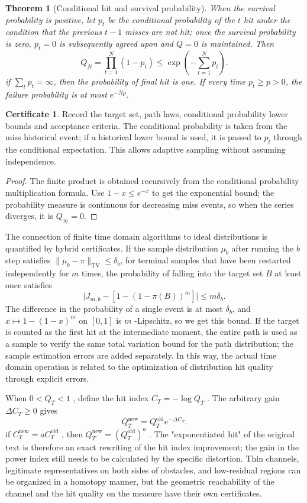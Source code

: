 \documentclass[11pt,a4paper]{article}
\theoremstyle{plain}
\newtheorem{theorem}{Theorem}[section]
\theoremstyle{definition}
\newtheorem*{certificate}{Certificate}
\theoremstyle{remark}
\begin{document}
\begin{CJK*}
\begin{theorem}
[Conditional hit and survival probability]\label{ss:survival}
When the survival probability is positive, let $p_t$ be the conditional probability of the $t$ hit under the condition that the previous $t-1$ misses are not hit; once the survival probability is zero, $p_t=0$ is subsequently agreed upon and $Q=0$ is maintained. Then \[
 Q_N=\prod_{t=1}^N(1-p_t)
 \le\exp\left(-\sum_{t=1}^Np_t\right).
\] if $\sum_t p_t=\infty$, then the probability of final hit is one. If every time $p_t\ge p>0$, the failure probability is at most $e^{-Np}$.\end{theorem}
\begin{certificate}
Record the target set, path laws, conditional probability lower bounds and acceptance criteria. The conditional probability is taken from the miss historical event; if a historical lower bound is used, it is passed to $p_t$ through the conditional expectation. This allows adaptive sampling without assuming independence.\end{certificate}
\begin{proof}
The finite product is obtained recursively from the conditional probability multiplication formula. Use $1-x\le e^{-x}$ to get the exponential bound; the probability measure is continuous for decreasing miss events, so when the series diverges, it is $Q_\infty=0$.\end{proof}


The connection of finite time domain algorithms to ideal distributions is quantified by hybrid certificates. If the sample distribution $\mu_b$ after running the $b$ step satisfies $\|\mu_b-\pi\|_{\mathrm{TV}}\le\delta_b$, for terminal samples that have been restarted independently for $m$ times, the probability of falling into the target set $B$ at least once satisfies \[
 \bigl|J_{m,b}-[1-(1-\pi(B))^m]\bigr|\le m\delta_b.
\] The difference in the probability of a single event is at most $\delta_b$, and $x\mapsto1-(1-x)^m$ on $[0,1]$ is $m$ -Lipschitz, so we get this bound. If the target is counted as the first hit at the intermediate moment, the entire path is used as a sample to verify the same total variation bound for the path distribution; the sample estimation errors are added separately. In this way, the actual time domain operation is related to the optimization of distribution hit quality through explicit errors.

When $0<Q_T<1$ , define the hit index $C_T=-\log Q_T$ . The arbitrary gain $\Delta C_T\ge0$ gives \[
 Q_T^{\mathrm{new}}=Q_T^{\mathrm{old}}e^{-\Delta C_T}.
\] if $C_T^{\mathrm{new}}=aC_T^{\mathrm{old}}$ , then $Q_T^{\mathrm{new}}=(Q_T^{\mathrm{old}})^a$ . The "exponentiated hit" of the original text is therefore an exact rewriting of the hit index improvement; the gain in the power index still needs to be calculated by the specific distortion. Thin channels, legitimate representatives on both sides of obstacles, and low-residual regions can be organized in a homotopy manner, but the geometric reachability of the channel and the hit quality on the measure have their own certificates.


\end{CJK*}
\end{document}
